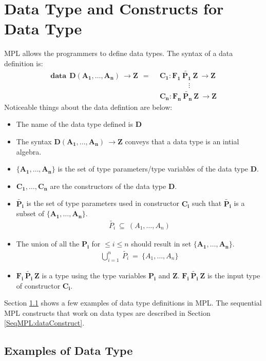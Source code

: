\documentclass[11pt]{article}
\begin{document}
\section {Data Type and Constructs for Data Type}\label{SeqMPL:dataandDCons}
MPL allows the programmers to define data types. The syntax of a data definition is:
\begin{align*} 
\mathbf{data~~D(A_1,\ldots,A_n)~\to Z~~=~~}&\mathbf{C_1: F_1~\tilde{P_1}~Z~ \to Z}\\
                                  &\mathbf{\qquad\qquad \vdots }\\    
                                  &\mathbf{C_n: F_n~\tilde{P_n}~Z ~ \to Z}
\end{align*}
Noticeable things about the data defintion are below:
\begin{itemize}
  \item The name of the data type defined is $\mathbf{D}$
  \item The syntax $\mathbf{D(A_1,\ldots,A_n)~\to Z}$ conveys that a data type is an intial algebra.
  \item $\mathbf{\{A_1,\ldots,A_n\}}$ is the set of type parameters/type variables of the data type $\mathbf{D}$.
  \item $\mathbf{C_1,\ldots,C_n}$ are the constructors of the data type $\mathbf{D}$.  
  \item $\mathbf{\tilde{P_i}}$ is the set of type parameters used in constructor $\mathbf{C_i}$ such that $\mathbf{\tilde{P_i}}$ is a subset of $\mathbf{\{A_1,\ldots,A_n\}}$.
  \begin{align*}
    \tilde{P_i}~\subseteq~(A_1,\ldots,A_n)
  \end{align*}
  \item The union of all the $\mathbf{{P_i}}$ for $\leq i \leq n$ should result in set $\mathbf{\{A_1,\ldots,A_n\}}$.   
  \begin{align*}
    \bigcup\limits_{i=1}^{n}~\tilde{P_i}~=~\{A_1,\ldots,A_n\}
  \end{align*}
  \item $\mathbf{F_i~\tilde{P_i}~Z}$ is a type using the type variables $\mathbf{P_i}$ and $\mathbf{Z}$. $\mathbf{F_i~\tilde{P_i}~Z}$ is the input type of constructor $\mathbf{C_i}$.
\end{itemize}
Section \ref {SeqMPL:dataExample} shows a few examples of data type definitions in MPL. The sequential MPL constructs that work on data types are described in Section \ref {SeqMPL:dataConstruct}.
\subsection {Examples of Data Type}\label{SeqMPL:dataExample}
\end{document}

